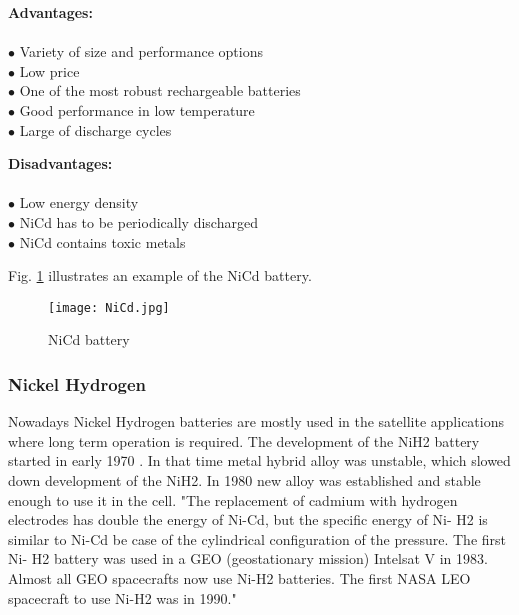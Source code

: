  \newpage

\begin{multicols}{2}

	\textbf{Advantages:} \\ \\
	$\bullet$ Variety of size and performance options\\
	$\bullet$ Low price\\
	$\bullet$ One of the most robust rechargeable batteries\\
	$\bullet$ Good performance in low temperature\\
	$\bullet$ Large of discharge cycles\\
	
	
	\columnbreak
	
	\textbf{Disadvantages:} \\ \\
	$\bullet$ Low energy density\\
	$\bullet$ NiCd has to be periodically discharged\\
	$\bullet$ NiCd contains toxic metals\\ 


\end{multicols}

Fig. \ref{fig: nicd} illustrates an example of the NiCd battery. 



\begin{figure}[h]
	\centering
	\texttt{[image: NiCd.jpg]}
	\caption{NiCd battery\cite{9}}
	\label{fig: nicd}
\end{figure} 


\subsubsection{Nickel Hydrogen \label{sec:tech}}
Nowadays Nickel Hydrogen batteries are mostly used in the satellite applications where long term operation is required. The development of the NiH2 battery started in early 1970 \cite{8}. In that time metal hybrid alloy was unstable, which slowed down development of the NiH2. In 1980 new alloy was established and stable enough to use it in the cell\cite{7}. 
\cite{10}"The replacement of cadmium with hydrogen electrodes has double the energy of Ni-Cd, but the specific energy of Ni- H2 is similar to Ni-Cd be case of the cylindrical configuration of the pressure. The first Ni- H2 battery was used in a GEO (geostationary mission) Intelsat V in 1983.  Almost all GEO spacecrafts now use Ni-H2 batteries. The first NASA LEO spacecraft to use Ni-H2 was in 1990."



